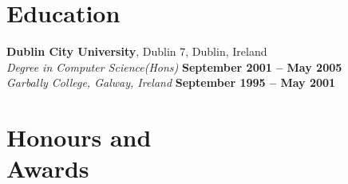 \documentclass[margin,line]{resume}
\begin{document}
\begin{resume}

    \section{\mysidestyle Education}
    \textbf{Dublin City University}, Dublin 7, Dublin, Ireland \vspace{2mm}\\\vspace{1mm}%
    \textsl{Degree in Computer Science(Hons)} \hfill \textbf{ September 2001 -- May 2005}\\
    \textsl{Garbally College, Galway, Ireland} \hfill \textbf{September 1995 -- May 2001}\vspace{-3mm}\\\vspace{-1mm}%


    \section{\mysidestyle Honours and\\Awards} 


\end{resume}
\end{document}
